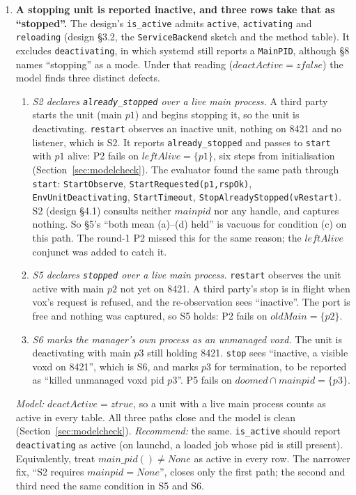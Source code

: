 \documentclass[a4paper,10pt,fleqn]{article}
\begin{document}
\begin{enumerate}
  \item[\textbf{F6.}] \textbf{A stopping unit is reported inactive, and
    three rows take that as ``stopped''.} The design's \texttt{is\_active}
    admits \texttt{active}, \texttt{activating} and \texttt{reloading}
    (design \S3.2, the \texttt{ServiceBackend} sketch and the method table).
    It excludes \texttt{deactivating}, in which systemd still reports a
    \texttt{MainPID}, although \S8 names ``stopping'' as a mode. Under that
    reading ($deactActive = zfalse$) the model finds three distinct defects.
    \begin{enumerate}
      \item \emph{S2 declares \texttt{already\_stopped} over a live main
        process.} A third party starts the unit (main $p1$) and begins
        stopping it, so the unit is deactivating. \texttt{restart} observes
        an inactive unit, nothing on 8421 and no listener, which is S2. It
        reports \texttt{already\_stopped} and passes to \texttt{start} with
        $p1$ alive: P2 fails on $leftAlive = \{p1\}$, six steps from
        initialisation (Section~\ref{sec:modelcheck}). The evaluator found
        the same path through \texttt{start}: \texttt{StartObserve},
        \texttt{StartRequested(p1,rspOk)}, \texttt{EnvUnitDeactivating},
        \texttt{StartTimeout},
        \texttt{StopAlreadyStopped(vRestart)}. S2 (design \S4.1) consults
        neither $mainpid$ nor any handle, and captures nothing. So \S5's
        ``both mean (a)--(d) held'' is vacuous for condition (c) on this
        path. The round-1 P2 missed this for the same reason; the
        $leftAlive$ conjunct was added to catch it.
      \item \emph{S5 declares \texttt{stopped} over a live main process.}
        \texttt{restart} observes the unit active with main $p2$ not yet on
        8421. A third party's stop is in flight when vox's request is
        refused, and the re-observation sees ``inactive''. The port is free
        and nothing was captured, so S5 holds: P2 fails on
        $oldMain = \{p2\}$.
      \item \emph{S6 marks the manager's own process as an unmanaged
        voxd.} The unit is deactivating with main $p3$ still holding 8421.
        \texttt{stop} sees ``inactive, a visible voxd on 8421'', which is
        S6, and marks $p3$ for termination, to be reported as ``killed
        unmanaged voxd pid $p3$''. P5 fails on
        $doomed \cap mainpid = \{p3\}$.
    \end{enumerate}
    \emph{Model:} $deactActive = ztrue$, so a unit with a live main process
    counts as active in every table. All three paths close and the model is
    clean (Section~\ref{sec:modelcheck}). \emph{Recommend:} the same.
    \texttt{is\_active} should report \texttt{deactivating} as active (on
    launchd, a loaded job whose pid is still present). Equivalently, treat
    $main\_pid() \neq None$ as active in every row. The narrower fix, ``S2
    requires $mainpid = None$'', closes only the first path; the second and
    third need the same condition in S5 and S6.
\end{enumerate}
\end{document}
